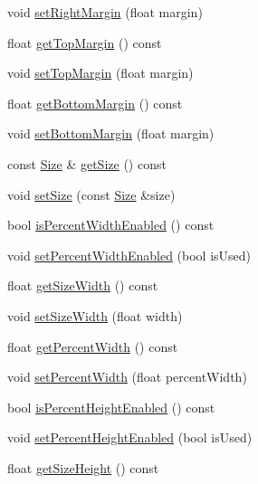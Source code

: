 \begin{DoxyCompactItemize}
\item 
void \hyperlink{classui_1_1LayoutComponent_a29db78fd2bd2fce9ce04526ae55377e3}{set\+Right\+Margin} (float margin)
\item 
float \hyperlink{classui_1_1LayoutComponent_a21749ecc8ce29be5518a54328f7508d8}{get\+Top\+Margin} () const
\item 
void \hyperlink{classui_1_1LayoutComponent_a3f88a5fedef99e54d7a78794f4bd193a}{set\+Top\+Margin} (float margin)
\item 
float \hyperlink{classui_1_1LayoutComponent_a264d31acf95b9361026acbd2ebf54e12}{get\+Bottom\+Margin} () const
\item 
void \hyperlink{classui_1_1LayoutComponent_a8c6be07216609a96c1721308c25e5384}{set\+Bottom\+Margin} (float margin)
\item 
const \hyperlink{classSize}{Size} \& \hyperlink{classui_1_1LayoutComponent_ad363e4da99754e0cd4ea18219a8bd4a9}{get\+Size} () const
\item 
void \hyperlink{classui_1_1LayoutComponent_a22fea5cb274bb846dd45c6e212e8b9e3}{set\+Size} (const \hyperlink{classSize}{Size} \&size)
\item 
bool \hyperlink{classui_1_1LayoutComponent_a7572a7ba515d90463eaa237ac9547275}{is\+Percent\+Width\+Enabled} () const
\item 
void \hyperlink{classui_1_1LayoutComponent_a225d5d4a20568a3a4a4b2f53732bdab4}{set\+Percent\+Width\+Enabled} (bool is\+Used)
\item 
float \hyperlink{classui_1_1LayoutComponent_afc2fc62ee5436a6e1a825e94ee69bc64}{get\+Size\+Width} () const
\item 
void \hyperlink{classui_1_1LayoutComponent_a38457ef477f1a6286021fabb7bce7ba2}{set\+Size\+Width} (float width)
\item 
float \hyperlink{classui_1_1LayoutComponent_a79288b7cb4520b1f81ab76b2541f7209}{get\+Percent\+Width} () const
\item 
void \hyperlink{classui_1_1LayoutComponent_a0cd30388085811c19d4939062e8643a5}{set\+Percent\+Width} (float percent\+Width)
\item 
bool \hyperlink{classui_1_1LayoutComponent_a79fe2006defc4f1f69104b415e800825}{is\+Percent\+Height\+Enabled} () const
\item 
void \hyperlink{classui_1_1LayoutComponent_aa3554e907c5770808e8ed24abb003996}{set\+Percent\+Height\+Enabled} (bool is\+Used)
\item 
float \hyperlink{classui_1_1LayoutComponent_aa00a66a58b28af9b2c685f09a0923922}{get\+Size\+Height} () const

\end{DoxyCompactItemize}
